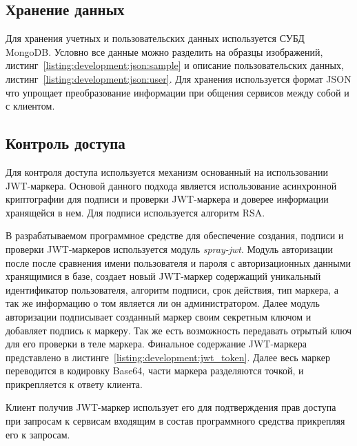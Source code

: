 \subsection{Хранение данных}
Для хранения учетных и пользовательских данных используется СУБД MongoDB. Условно все данные можно разделить на образцы изображений, листинг~\ref{listing:development:json:sample} и описание пользовательских данных, листинг~\ref{listing:development:json:user}. Для хранения используется формат JSON что упрощает преобразование информации при общения сервисов между собой и с клиентом. 





\subsection{Контроль доступа}
\label{sec:development:access_control}
Для контроля доступа используется механизм основанный на использовании JWT-маркера. Основой данного подхода является использование асинхронной криптографии для подписи и проверки JWT-маркера и доверее информации хранящейся в нем. Для подписи используется алгоритм RSA.

В разрабатываемом программное средстве для обеспечение создания, подписи и проверки JWT-маркеров используется модуль \emph{spray-jwt}. Модуль авторизации после после сравнения имени пользователя и пароля с авторизационных данными хранящимися в базе, создает новый JWT-маркер содержащий уникальный идентификатор пользователя, алгоритм подписи, срок действия, тип маркера, а так же информацию о том является ли он администратором. Далее модуль авторизации подписывает созданный маркер своим секретным ключом и добавляет подпись к маркеру. Так же есть возможность передавать отрытый ключ для его проверки в теле маркера.
Финальное содержание JWT-маркера представлено в листинге~\ref{listing:development:jwt_token}. Далее весь маркер переводится в кодировку Base64, части маркера разделяются точкой, и прикрепляется к ответу клиента.


Клиент получив JWT-маркер использует его для подтверждения прав доступа при запросам к сервисам входящим в состав программного средства прикрепляя его к запросам.

